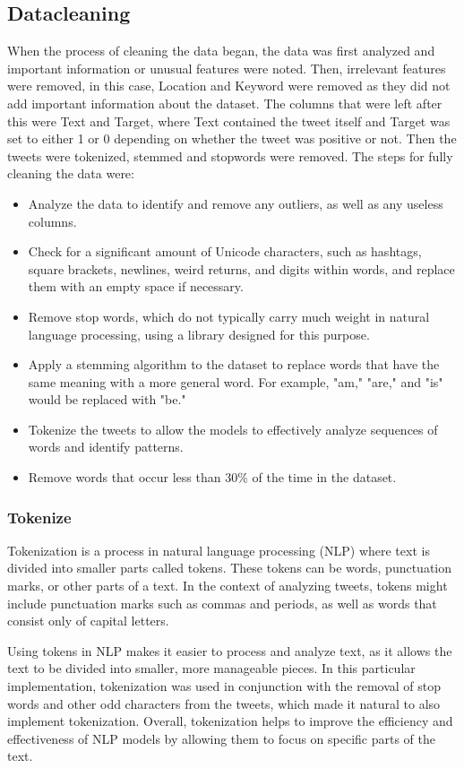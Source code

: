 \documentclass[conference]{IEEEtran}
\begin{document}
\subsection{Datacleaning}
When the process of cleaning the data began, the data was first analyzed and important information or unusual features were noted.
Then, irrelevant features were removed, in this case, Location and Keyword were removed as they did not add important information about the dataset. 
The columns that were left after this were Text and Target, where Text contained the tweet itself and Target was set to either 1 or 0 depending on whether the tweet was positive or not. Then the tweets were tokenized, stemmed and stopwords were removed.
The steps for fully cleaning the data were:
\newline
\begin{itemize}
    \item Analyze the data to identify and remove any outliers, as well as any useless columns.
    \item Check for a significant amount of Unicode characters, such as hashtags, square brackets, newlines, weird returns, and digits within words, and replace them with an empty space if necessary.
    \item Remove stop words, which do not typically carry much weight in natural language processing, using a library designed for this purpose.
    \item Apply a stemming algorithm to the dataset to replace words that have the same meaning with a more general word. For example, "am," "are," and "is" would be replaced with "be."
    \item Tokenize the tweets to allow the models to effectively analyze sequences of words and identify patterns.
    \item Remove words that occur less than 30\% of the time in the dataset.
\end{itemize}

\subsubsection{Tokenize}
Tokenization is a process in natural language processing (NLP) where text is divided into smaller parts called tokens. These tokens can be words, punctuation marks, or other parts of a text. In the context of analyzing tweets, tokens might include punctuation marks such as commas and periods, as well as words that consist only of capital letters.

Using tokens in NLP makes it easier to process and analyze text, as it allows the text to be divided into smaller, more manageable pieces. In this particular implementation, tokenization was used in conjunction with the removal of stop words and other odd characters from the tweets, which made it natural to also implement tokenization. Overall, tokenization helps to improve the efficiency and effectiveness of NLP models by allowing them to focus on specific parts of the text.\cite{burchfiel_2022} \cite{albon2018machine}
\newline
\end{document}
